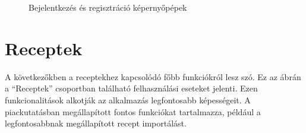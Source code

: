 \documentclass[12pt]{report}
\theoremstyle{definition}
\begin{document}
\begin{figure}[H]%
    \centering
    \qquad
    \caption{Bejelentkezés és regisztráció képernyőpépek}%
    \label{fig:loginRegis}%
\end{figure}


\section{Receptek}
A következőkben a receptekhez kapcsolódó főbb funkciókról lesz szó. Ez az ábrán a “Receptek” csoportban található felhasználási eseteket jelenti. Ezen funkcionalitások alkotják az alkalmazás legfontosabb képességeit. A piackutatásban megállapított fontos funkciókat tartalmazza, például a legfontosabbnak megállapított recept importálást.
\end{document}
